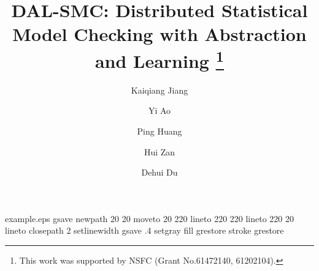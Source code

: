 %
%
%
%
%
\begin{filecontents*}{example.eps}
gsave
newpath
  20 20 moveto
  20 220 lineto
  220 220 lineto
  220 20 lineto
closepath
2 setlinewidth
gsave
  .4 setgray fill
grestore
stroke
grestore
\end{filecontents*}
%
\RequirePackage{fix-cm}

%
\documentclass[twocolumn]{svjour3}          %
%
\smartqed  %
%
\usepackage{graphicx}
\usepackage{subfigure}
\usepackage{booktabs} %
\usepackage[ruled]{algorithm2e} %
\usepackage{multirow}
\newcommand{\tabincell}[2]{\begin{tabular}{@{}#1@{}}#2\end{tabular}}
%
%
%
%
%


\title{DAL-SMC: Distributed Statistical Model Checking with Abstraction and Learning
\thanks{This work was supported by NSFC (Grant No.61472140, 61202104).}
}


\author{Kaiqiang Jiang \and Yi Ao \and Ping Huang \and Hui Zan \and Dehui Du}

